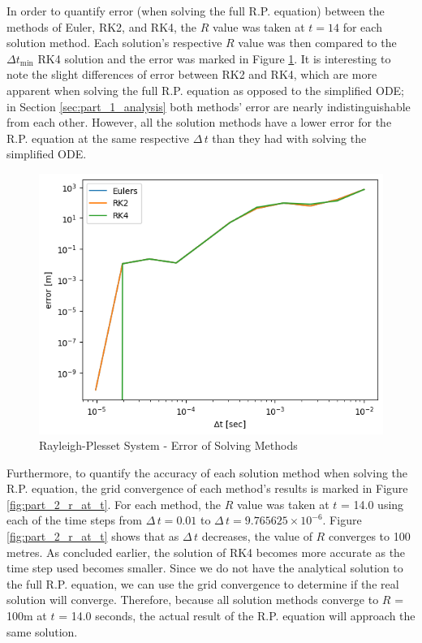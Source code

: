 \documentclass[12pt]{article}
\begin{document}
In order to quantify error (when solving the full R.P. equation) between the methods of Euler, RK2, and RK4, the $R$ value was taken at $t = 14$ for each solution method. Each solution's respective $R$ value was then compared to the $\Delta t_{\text{min}}$ RK4 solution and the error was marked in Figure \ref{fig:part_2_error}. It is interesting to note the slight differences of error between RK2 and RK4, which are more apparent when solving the full R.P. equation as opposed to the simplified ODE; in Section \ref{sec:part_1_analysis} both methods' error are nearly indistinguishable from each other. However, all the solution methods have a lower error for the R.P. equation at the same respective $\Delta \, t$ than they had with solving the simplified ODE. 

\begin{figure}[H]
    \centering
    \includegraphics[scale=0.75]{out/error/Question_2/error.png}
    \caption{Rayleigh-Plesset System - Error of Solving Methods}
    \label{fig:part_2_error}
\end{figure}

Furthermore, to quantify the accuracy of each solution method when solving the R.P. equation, the grid convergence of each method's results is marked in Figure \ref{fig:part_2_r_at_t}. For each method, the $R$ value was taken at $t$ = 14.0 using each of the time steps from $\Delta\,t = 0.01$ to $\Delta\,t = 9.765625\times10^{-6}$. Figure \ref{fig:part_2_r_at_t} shows that as $\Delta\, t$ decreases, the value of $R$ converges to 100 metres. As concluded earlier, the solution of RK4 becomes more accurate as the time step used becomes smaller. Since we do not have the analytical solution to the full R.P. equation, we can use the grid convergence to determine if the real solution will converge. Therefore, because all solution methods converge to $R$ = 100m at $t$ = 14.0 seconds, the actual result of the R.P. equation will approach the same solution.
\end{document}

